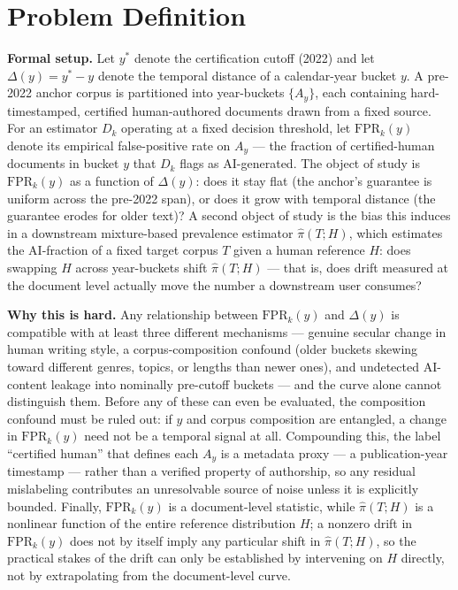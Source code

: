 \documentclass[11pt]{article}
\begin{document}
\section{Problem Definition}

\noindent\textbf{Formal setup.} Let $y^*$ denote the certification cutoff (2022) and let $\Delta(y) = y^* - y$ denote the temporal distance of a calendar-year bucket $y$. A pre-2022 anchor corpus is partitioned into year-buckets $\{A_y\}$, each containing hard-timestamped, certified human-authored documents drawn from a fixed source. For an estimator $D_k$ operating at a fixed decision threshold, let $\mathrm{FPR}_k(y)$ denote its empirical false-positive rate on $A_y$ --- the fraction of certified-human documents in bucket $y$ that $D_k$ flags as AI-generated. The object of study is $\mathrm{FPR}_k(y)$ as a function of $\Delta(y)$: does it stay flat (the anchor's guarantee is uniform across the pre-2022 span), or does it grow with temporal distance (the guarantee erodes for older text)? A second object of study is the bias this induces in a downstream mixture-based prevalence estimator $\hat{\pi}(T; H)$, which estimates the AI-fraction of a fixed target corpus $T$ given a human reference $H$: does swapping $H$ across year-buckets shift $\hat{\pi}(T; H)$ --- that is, does drift measured at the document level actually move the number a downstream user consumes?

\noindent\textbf{Why this is hard.} Any relationship between $\mathrm{FPR}_k(y)$ and $\Delta(y)$ is compatible with at least three different mechanisms --- genuine secular change in human writing style, a corpus-composition confound (older buckets skewing toward different genres, topics, or lengths than newer ones), and undetected AI-content leakage into nominally pre-cutoff buckets --- and the curve alone cannot distinguish them. Before any of these can even be evaluated, the composition confound must be ruled out: if $y$ and corpus composition are entangled, a change in $\mathrm{FPR}_k(y)$ need not be a temporal signal at all. Compounding this, the label ``certified human'' that defines each $A_y$ is a metadata proxy --- a publication-year timestamp --- rather than a verified property of authorship, so any residual mislabeling contributes an unresolvable source of noise unless it is explicitly bounded. Finally, $\mathrm{FPR}_k(y)$ is a document-level statistic, while $\hat{\pi}(T; H)$ is a nonlinear function of the entire reference distribution $H$; a nonzero drift in $\mathrm{FPR}_k(y)$ does not by itself imply any particular shift in $\hat{\pi}(T; H)$, so the practical stakes of the drift can only be established by intervening on $H$ directly, not by extrapolating from the document-level curve.
\end{document}

